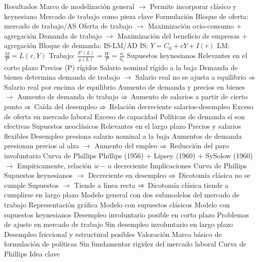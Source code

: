 \documentclass{nuevotema}
\begin{document}
\begin{esquemal}
				\4 Resultados
				\4[] Marco de modelización general
				\4[] $\to$ Permite incorporar clásico y keynesiano
				\4[] Mercado de trabajo como pieza clave
			\3 Formulación
				\4 Bloque de oferta: mercado de trabajo/AS
				\4[] Oferta de trabajo
				\4[] $\to$ Maximización ocio-consumo + agregación
				\4[] Demanda de trabajo
				\4[] $\to$ Maximización del beneficio de empresas + agregación
				\4 Bloque de demanda: IS-LM/AD
				\4[] IS: $Y = C_0 + cY + I(r)$
				\4[] LM: $\frac{M}{P} = L(r,Y)$
				\4[] Trabajo: $\frac{F'(L)}{\mu(L)} = \frac{W}{P} = \frac{u_l}{u_c}$
				\4 Supuestos keynesianos
				\4[] Relevantes en el corto plazo
				\4[] Precios (P) rígidos
				\4[] Salario nominal rígido a la baja
				\4[] Demanda de bienes determina demanda de trabajo
				\4[] $\to$ Salario real no se ajusta a equilibrio
				\4[] $\then$ Salario real por encima de equilibrio
				\4[] Aumento de demanda y precios en bienes
				\4[] $\to$ Aumento de demanda de trabajo
				\4[] $\then$ Aumento de salarios a partir de cierto punto
				\4[] $\then$ Caída del desempleo
				\4[] $\then$ Relación decreciente salarios-desempleo
				\4[$\then$] Exceso de oferta en mercado laboral
				\4[$\then$] Exceso de capacidad
				\4[$\then$] Políticas de demanda sí son efectivas
				\4 Supuestos neoclásicos
				\4[] Relevantes en el largo plazo
				\4[] Precios y salarios flexibles
				\4[] Desempleo presiona salario nominal a la baja
				\4[] Aumentos de demanda presionan precios al alza
				\4[] $\to$ Aumento del empleo
				\4[] $\then$ Reducción del paro involuntario
				\4 Curva de Phillips
				\4[] Phillips (1956) + Lipsey (1960) + SySolow (1960)
				\4[] $\to$ Empíricamente, relación $\dot{w}-u$ decreciente
			\3 Implicaciones
				\4 Curva de Phillips
				\4[] Supuestos keynesianos
				\4[] $\to$ Decreciente en desempleo
				\4[] $\then$ Dicotomía clásica no se cumple
				\4[] Supuestos
				\4[] $\to$ Tiende a línea recta
				\4[] $\then$ Dicotomía clásica tiende a cumplirse en largo plazo
				\4 Modelo general con dos submodelos del mercado de trabajo
				\4 Representación gráfica
				\4[] Modelo con supuestos clásicos
				\4[] 
				\4[] Modelo con supuestos keynesianos
				\4[] 
				\4 Desempleo involuntario posible en corto plazo
				\4[] Problemas de ajuste en mercado de trabajo
				\4 Sin desempleo involuntario en largo plazo
				\4[] Desempleo friccional y estructural posibles
			\3 Valoración
				\4 Marco básico de formulación de políticas
				\4 Sin fundamentar rigidez del mercado laboral
		\2 Curva de Phillips
			\3 Idea clave

\end{esquemal}
\end{document}
